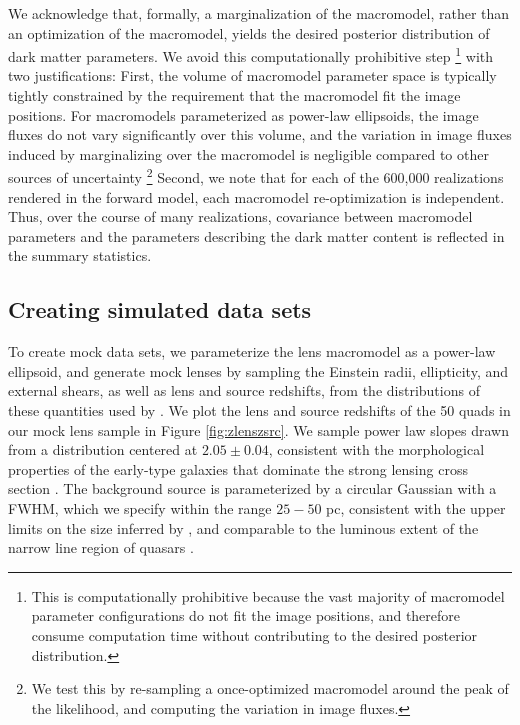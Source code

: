 We acknowledge that, formally, a marginalization of the macromodel, rather than an optimization of the macromodel, yields the desired posterior distribution of dark matter parameters. We avoid this computationally prohibitive step \footnote{This is computationally prohibitive because the vast majority of macromodel parameter configurations do not fit the image positions, and therefore consume computation time without contributing to the desired posterior distribution.} with two justifications: First, the volume of macromodel parameter space is typically tightly constrained by the requirement that the macromodel fit the image positions. For macromodels parameterized as power-law ellipsoids, the image fluxes do not vary significantly over this volume, and the variation in image fluxes induced by marginalizing over the macromodel is negligible compared to other sources of uncertainty \footnote{We test this by re-sampling a once-optimized macromodel around the peak of the likelihood, and computing the variation in image fluxes.} Second, we note that for each of the 600,000 realizations rendered in the forward model, each macromodel re-optimization is independent. Thus, over the course of many realizations, covariance between macromodel parameters and the parameters describing the dark matter content is reflected in the summary statistics. 

\subsection{Creating simulated data sets}
\label{ssec:simdata}

To create mock data sets, we parameterize the lens macromodel as a power-law ellipsoid, and generate mock lenses by sampling the Einstein radii, ellipticity, and external shears, as well as lens and source redshifts, from the distributions of these quantities used by \citet{OguriMarshall10}. We plot the lens and source redshifts of the 50 quads in our mock lens sample in Figure \ref{fig:zlenszsrc}. We sample power law slopes drawn from a distribution centered at $2.05 \pm 0.04$, consistent with the morphological properties of the early-type galaxies that dominate the strong lensing cross section \citep{Auger++10,Shankar++17}. The background source is parameterized by a circular Gaussian with a FWHM, which we specify within the range $25-50$ pc, consistent with the upper limits on the size inferred by \citet{Nierenberg++17}, and comparable to the luminous extent of the narrow line region of quasars \citep{MullerSanchez++11}. 

